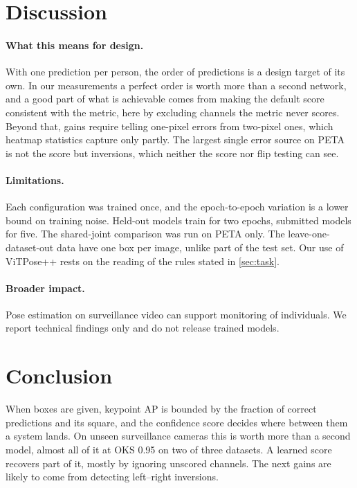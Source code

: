 \documentclass[10pt,twocolumn,letterpaper]{article}
\begin{document}
\section{Discussion}

\paragraph{What this means for design.} With one prediction per person, the order of predictions is a design target of its own. In our measurements a perfect order is worth more than a second network, and a good part of what is achievable comes from making the default score consistent with the metric, here by excluding channels the metric never scores. Beyond that, gains require telling one-pixel errors from two-pixel ones, which heatmap statistics capture only partly. The largest single error source on PETA is not the score but inversions, which neither the score nor flip testing can see.

\paragraph{Limitations.} Each configuration was trained once, and the epoch-to-epoch variation is a lower bound on training noise. Held-out models train for two epochs, submitted models for five. The shared-joint comparison was run on PETA only. The leave-one-dataset-out data have one box per image, unlike part of the test set. Our use of ViTPose++ rests on the reading of the rules stated in \cref{sec:task}.

\paragraph{Broader impact.} Pose estimation on surveillance video can support monitoring of individuals. We report technical findings only and do not release trained models.

\section{Conclusion}

When boxes are given, keypoint AP is bounded by the fraction of correct predictions and its square, and the confidence score decides where between them a system lands. On unseen surveillance cameras this is worth more than a second model, almost all of it at OKS 0.95 on two of three datasets. A learned score recovers part of it, mostly by ignoring unscored channels. The next gains are likely to come from detecting left--right inversions.
\end{document}
